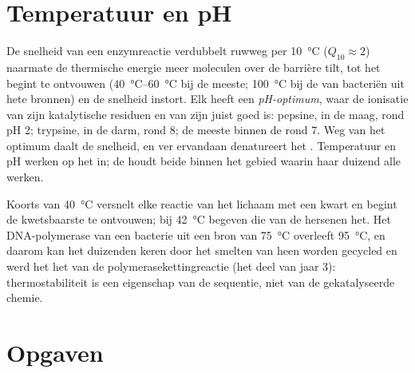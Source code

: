 \section{Temperatuur en pH}

\begin{proposition}\label{prop:b1:enzymes:environment}
De snelheid van een enzymreactie verdubbelt ruwweg per \qty{10}{\celsius}
($Q_{10} \approx 2$) naarmate de thermische energie meer moleculen over de
barrière tilt, tot het  begint te ontvouwen (\qtyrange{40}{60}{\celsius} bij
de meeste; \qty{100}{\celsius} bij de  van bacteriën uit hete bronnen) en
de snelheid instort. Elk  heeft een \emph{pH-optimum}, waar de ionisatie van
zijn katalytische residuen en van zijn  juist goed is: pepsine, in de
maag, rond pH 2; trypsine, in de darm, rond 8; de meeste  binnen de 
rond 7. Weg van het optimum daalt de snelheid, en ver ervandaan denatureert het
. Temperatuur en pH werken op het  in; de  houdt beide binnen het
gebied waarin haar duizend  alle werken.
\end{proposition}

\begin{example}\label{ex:b1:enzymes:fever}
Koorts van \qty{40}{\celsius} versnelt elke reactie van het lichaam met een kwart
en begint de kwetsbaarste  te ontvouwen; bij \qty{42}{\celsius} begeven
die van de hersenen het. Het DNA-polymerase van een bacterie uit een bron van
\qty{75}{\celsius} overleeft \qty{95}{\celsius}, en daarom kan het duizenden keren
door het smelten van  heen worden gecycled en werd het het  van de
polymerasekettingreactie (het deel van jaar 3): thermostabiliteit is een
eigenschap van de sequentie, niet van de gekatalyseerde chemie.
\end{example}

\section{Opgaven}

